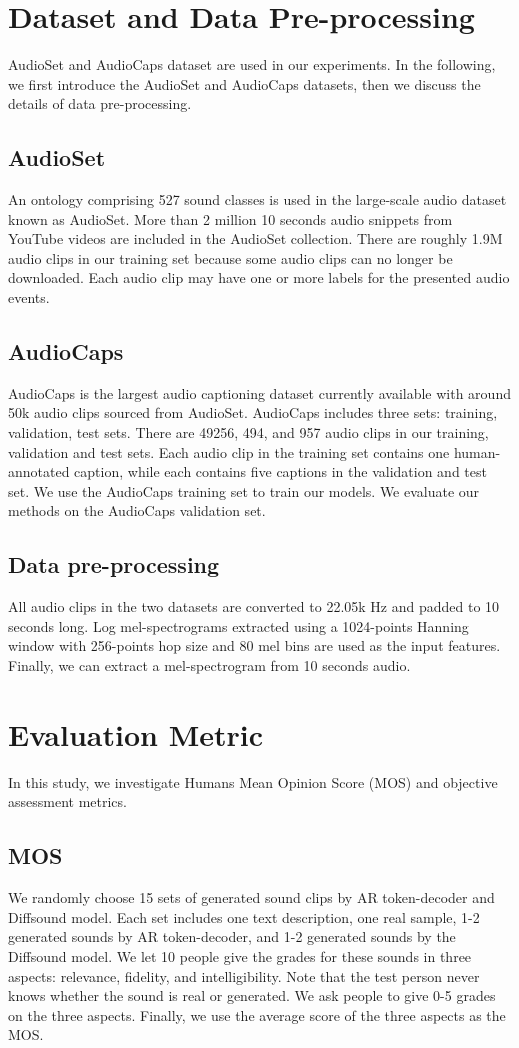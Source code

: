 \documentclass[lettersize,journal]{IEEEtran}
\begin{document}
\section{Dataset and Data Pre-processing}
AudioSet \cite{gemmeke2017audio} and AudioCaps \cite{kim2019audiocaps} dataset are used in our experiments. In the following, we first introduce the AudioSet and AudioCaps datasets, then we discuss the details of data pre-processing.
\subsection{AudioSet} 
An ontology comprising 527 sound classes is used in the large-scale audio dataset known as AudioSet. More than 2 million 10 seconds audio snippets from YouTube videos are included in the AudioSet collection. There are roughly 1.9M audio clips in our training set because some audio clips can no longer be downloaded. Each audio clip may have one or more labels for the presented audio events.
\subsection{AudioCaps} AudioCaps is the largest audio captioning dataset currently available with around 50k audio clips sourced from AudioSet. AudioCaps includes three sets: training, validation, test sets. There are 49256, 494, and 957 audio clips in our training, validation and test sets. Each audio clip in the training set contains one human-annotated caption, while each contains five captions in the validation and test set. We use the AudioCaps training set to train our models. We evaluate our methods on the AudioCaps validation set. 
\subsection{Data pre-processing}
All audio clips in the two datasets are converted to 22.05k Hz and
padded to 10 seconds long. Log mel-spectrograms extracted using a 1024-points Hanning window with 256-points hop size and 80 mel bins
are used as the input features. Finally, we can extract a  mel-spectrogram from 10 seconds audio. 
\section{Evaluation Metric} \label{sec:evaluation metrix}
In this study, we investigate Humans Mean Opinion Score (MOS) and objective assessment metrics.
\subsection{MOS} We randomly choose 15 sets of generated sound clips by AR token-decoder and Diffsound model. Each set includes one text description, one real sample, 1-2 generated sounds by AR token-decoder, and 1-2 generated sounds by the Diffsound model. We let 10 people give the grades for these sounds in three aspects: relevance, fidelity, and intelligibility. Note that the test person never knows whether the sound is real or generated. We ask people to give 0-5 grades on the three aspects. Finally, we use the average score of the three aspects as the MOS.
\end{document}

